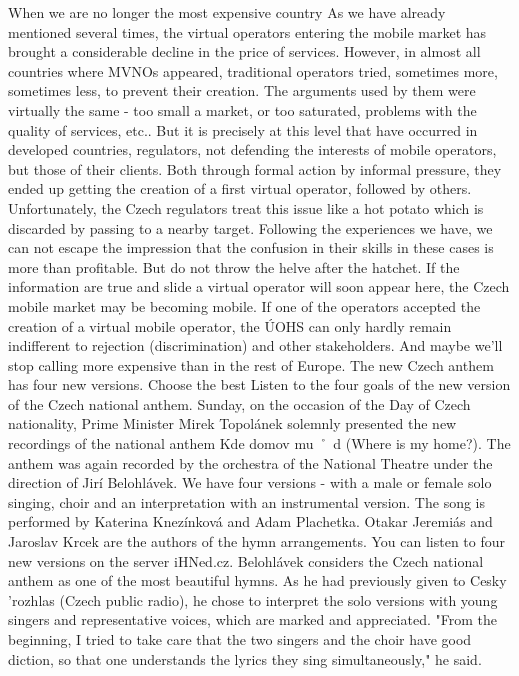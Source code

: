 When we are no longer the most expensive country
As we have already mentioned several times, the virtual operators entering the mobile market has brought a considerable decline in the price of services.
However, in almost all countries where MVNOs appeared, traditional operators tried, sometimes more, sometimes less, to prevent their creation.
The arguments used by them were virtually the same - too small a market, or too saturated, problems with the quality of services, etc..
But it is precisely at this level that have occurred in developed countries, regulators, not defending the interests of mobile operators, but those of their clients.
Both through formal action by informal pressure, they ended up getting the creation of a first virtual operator, followed by others.
Unfortunately, the Czech regulators treat this issue like a hot potato which is discarded by passing to a nearby target.
Following the experiences we have, we can not escape the impression that the confusion in their skills in these cases is more than profitable.
But do not throw the helve after the hatchet.
If the information are true and slide a virtual operator will soon appear here, the Czech mobile market may be becoming mobile.
If one of the operators accepted the creation of a virtual mobile operator, the ÚOHS can only hardly remain indifferent to rejection (discrimination) and other stakeholders.
And maybe we'll stop calling more expensive than in the rest of Europe.
The new Czech anthem has four new versions.
Choose the best
Listen to the four goals of the new version of the Czech national anthem.
Sunday, on the occasion of the Day of Czech nationality, Prime Minister Mirek Topolánek solemnly presented the new recordings of the national anthem Kde domov mu ˚ d (Where is my home?).
The anthem was again recorded by the orchestra of the National Theatre under the direction of Jirí Belohlávek.
We have four versions - with a male or female solo singing, choir and an interpretation with an instrumental version.
The song is performed by Katerina Knezínková and Adam Plachetka.
Otakar Jeremiás and Jaroslav Krcek are the authors of the hymn arrangements.
You can listen to four new versions on the server iHNed.cz.
Belohlávek considers the Czech national anthem as one of the most beautiful hymns.
As he had previously given to Cesky 'rozhlas (Czech public radio), he chose to interpret the solo versions with young singers and representative voices, which are marked and appreciated.
"From the beginning, I tried to take care that the two singers and the choir have good diction, so that one understands the lyrics they sing simultaneously," he said.
